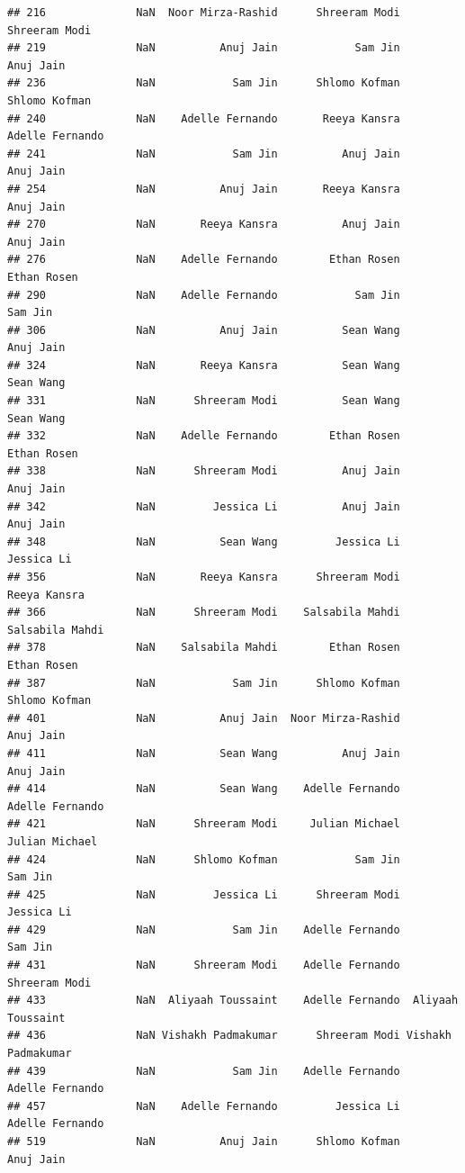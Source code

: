 \documentclass[
]{article}
\begin{document}
\begin{verbatim}
## 216              NaN  Noor Mirza-Rashid      Shreeram Modi      Shreeram Modi
## 219              NaN          Anuj Jain            Sam Jin          Anuj Jain
## 236              NaN            Sam Jin      Shlomo Kofman      Shlomo Kofman
## 240              NaN    Adelle Fernando       Reeya Kansra    Adelle Fernando
## 241              NaN            Sam Jin          Anuj Jain          Anuj Jain
## 254              NaN          Anuj Jain       Reeya Kansra          Anuj Jain
## 270              NaN       Reeya Kansra          Anuj Jain          Anuj Jain
## 276              NaN    Adelle Fernando        Ethan Rosen        Ethan Rosen
## 290              NaN    Adelle Fernando            Sam Jin            Sam Jin
## 306              NaN          Anuj Jain          Sean Wang          Anuj Jain
## 324              NaN       Reeya Kansra          Sean Wang          Sean Wang
## 331              NaN      Shreeram Modi          Sean Wang          Sean Wang
## 332              NaN    Adelle Fernando        Ethan Rosen        Ethan Rosen
## 338              NaN      Shreeram Modi          Anuj Jain          Anuj Jain
## 342              NaN         Jessica Li          Anuj Jain          Anuj Jain
## 348              NaN          Sean Wang         Jessica Li         Jessica Li
## 356              NaN       Reeya Kansra      Shreeram Modi       Reeya Kansra
## 366              NaN      Shreeram Modi    Salsabila Mahdi    Salsabila Mahdi
## 378              NaN    Salsabila Mahdi        Ethan Rosen        Ethan Rosen
## 387              NaN            Sam Jin      Shlomo Kofman      Shlomo Kofman
## 401              NaN          Anuj Jain  Noor Mirza-Rashid          Anuj Jain
## 411              NaN          Sean Wang          Anuj Jain          Anuj Jain
## 414              NaN          Sean Wang    Adelle Fernando    Adelle Fernando
## 421              NaN      Shreeram Modi     Julian Michael     Julian Michael
## 424              NaN      Shlomo Kofman            Sam Jin            Sam Jin
## 425              NaN         Jessica Li      Shreeram Modi         Jessica Li
## 429              NaN            Sam Jin    Adelle Fernando            Sam Jin
## 431              NaN      Shreeram Modi    Adelle Fernando      Shreeram Modi
## 433              NaN  Aliyaah Toussaint    Adelle Fernando  Aliyaah Toussaint
## 436              NaN Vishakh Padmakumar      Shreeram Modi Vishakh Padmakumar
## 439              NaN            Sam Jin    Adelle Fernando    Adelle Fernando
## 457              NaN    Adelle Fernando         Jessica Li    Adelle Fernando
## 519              NaN          Anuj Jain      Shlomo Kofman          Anuj Jain

\end{verbatim}
\end{document}

